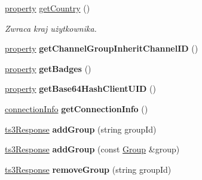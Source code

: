 \begin{DoxyCompactItemize}
\item 
\hyperlink{struct_ts3_api_1_1_client_1_1property}{property} \hyperlink{class_ts3_api_1_1_client_a7aea0d7be0c13772bf0cbcfe435d5b35}{get\+Country} ()
\begin{DoxyCompactList}\small\item\em Zwraca kraj użytkownika. \end{DoxyCompactList}\item 
\hyperlink{struct_ts3_api_1_1_client_1_1property}{property} {\bfseries get\+Channel\+Group\+Inherit\+Channel\+ID} ()\hypertarget{class_ts3_api_1_1_client_a7ca8f8068c190499d056c49496cdb2e8}{}\label{class_ts3_api_1_1_client_a7ca8f8068c190499d056c49496cdb2e8}

\item 
\hyperlink{struct_ts3_api_1_1_client_1_1property}{property} {\bfseries get\+Badges} ()\hypertarget{class_ts3_api_1_1_client_a13b167d84730f97ef069395d58bb2b24}{}\label{class_ts3_api_1_1_client_a13b167d84730f97ef069395d58bb2b24}

\item 
\hyperlink{struct_ts3_api_1_1_client_1_1property}{property} {\bfseries get\+Base64\+Hash\+Client\+U\+ID} ()\hypertarget{class_ts3_api_1_1_client_aea48dfe6fed2db31878bfb46093f315d}{}\label{class_ts3_api_1_1_client_aea48dfe6fed2db31878bfb46093f315d}

\item 
\hyperlink{struct_ts3_api_1_1_client_1_1connection_info}{connection\+Info} {\bfseries get\+Connection\+Info} ()\hypertarget{class_ts3_api_1_1_client_a59fb7b7c522625c35a1d1a8e7e125d5a}{}\label{class_ts3_api_1_1_client_a59fb7b7c522625c35a1d1a8e7e125d5a}

\item 
\hyperlink{struct_ts3_api_1_1ts3_response}{ts3\+Response} {\bfseries add\+Group} (string group\+Id)\hypertarget{class_ts3_api_1_1_client_aa750751c286e1455c1d19c939efd4c0b}{}\label{class_ts3_api_1_1_client_aa750751c286e1455c1d19c939efd4c0b}

\item 
\hyperlink{struct_ts3_api_1_1ts3_response}{ts3\+Response} {\bfseries add\+Group} (const \hyperlink{class_ts3_api_1_1_group}{Group} \&group)\hypertarget{class_ts3_api_1_1_client_a35a6a7ad28623a19bdbb186f871a670c}{}\label{class_ts3_api_1_1_client_a35a6a7ad28623a19bdbb186f871a670c}

\item 
\hyperlink{struct_ts3_api_1_1ts3_response}{ts3\+Response} {\bfseries remove\+Group} (string group\+Id)\hypertarget{class_ts3_api_1_1_client_a8e204f17ea4fc85f7f7c0ffb2da656c2}{}\label{class_ts3_api_1_1_client_a8e204f17ea4fc85f7f7c0ffb2da656c2}


\end{DoxyCompactItemize}
